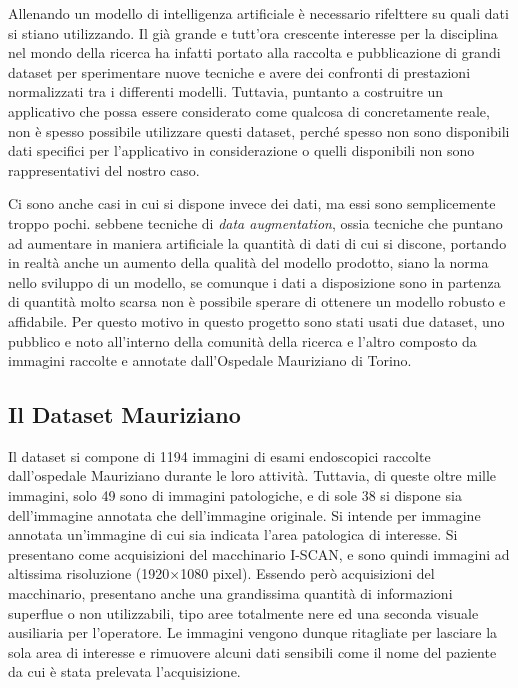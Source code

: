 Allenando un modello di intelligenza artificiale è necessario
rifelttere su quali dati si stiano utilizzando.
Il già grande e tutt'ora crescente interesse per la disciplina
nel mondo della ricerca ha infatti portato alla raccolta
e pubblicazione di grandi dataset per sperimentare
nuove tecniche e avere dei confronti di prestazioni
normalizzati tra i differenti modelli.
Tuttavia, puntanto a costruitre un applicativo che possa essere
considerato come qualcosa di concretamente reale, non è
spesso possibile utilizzare questi dataset, perché
spesso non sono disponibili dati specifici per l'applicativo
in considerazione o quelli disponibili non sono rappresentativi
del nostro caso.

Ci sono anche casi in cui si dispone invece dei dati, ma
essi sono semplicemente troppo pochi.
sebbene tecniche di {\it data augmentation}, ossia tecniche
che puntano ad aumentare in maniera artificiale la quantità
di dati di cui si discone, portando in realtà anche un
aumento della qualità del modello prodotto, siano la norma
nello sviluppo di un modello, se comunque i dati a disposizione
sono in partenza di quantità molto scarsa non è possibile
sperare di ottenere un modello robusto e affidabile.
Per questo motivo in questo progetto sono stati usati due
dataset, uno pubblico e noto all'interno della comunità
della ricerca e l'altro composto da immagini raccolte e
annotate dall'Ospedale Mauriziano di Torino.

\subsection{\label{sec:dataset-mauriziano}Il Dataset Mauriziano}

Il dataset si compone di 1194 immagini di esami endoscopici
raccolte dall'ospedale Mauriziano durante le loro attività.
Tuttavia, di queste oltre mille immagini, solo 49 sono
di immagini patologiche, e di sole 38 si dispone sia
dell'immagine annotata che dell'immagine originale.
Si intende per immagine annotata un'immagine di cui sia
indicata l'area patologica di interesse.
Si presentano come acquisizioni del macchinario I-SCAN,
e sono quindi immagini ad altissima risoluzione 
(1920$\times$1080 pixel).
Essendo però acquisizioni del macchinario, presentano anche
una grandissima quantità di informazioni superflue o non 
utilizzabili, tipo aree totalmente nere ed una seconda
visuale ausiliaria per l'operatore.
Le immagini vengono dunque ritagliate per lasciare la sola area
di interesse e rimuovere alcuni dati sensibili come il nome
del paziente da cui è stata prelevata l'acquisizione.

